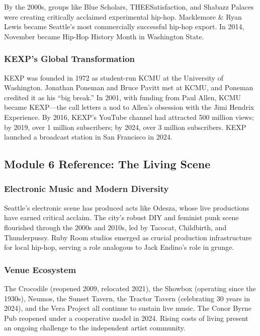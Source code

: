 \documentclass[11pt,letterpaper]{article}
\begin{document}
By the 2000s, groups like Blue Scholars, THEESatisfaction, and Shabazz Palaces were creating critically acclaimed experimental hip-hop. Macklemore \& Ryan Lewis became Seattle's most commercially successful hip-hop export. In 2014, November became Hip-Hop History Month in Washington State.

\subsubsection{KEXP's Global Transformation}

KEXP was founded in 1972 as student-run KCMU at the University of Washington. Jonathan Poneman and Bruce Pavitt met at KCMU, and Poneman credited it as his ``big break.'' In 2001, with funding from Paul Allen, KCMU became KEXP---the call letters a nod to Allen's obsession with the Jimi Hendrix Experience. By 2016, KEXP's YouTube channel had attracted 500 million views; by 2019, over 1 million subscribers; by 2024, over 3 million subscribers. KEXP launched a broadcast station in San Francisco in 2024.

\subsection{Module 6 Reference: The Living Scene}

\subsubsection{Electronic Music and Modern Diversity}

Seattle's electronic scene has produced acts like Odesza, whose live productions have earned critical acclaim. The city's robust DIY and feminist punk scene flourished through the 2000s and 2010s, led by Tacocat, Childbirth, and Thunderpussy. Ruby Room studios emerged as crucial production infrastructure for local hip-hop, serving a role analogous to Jack Endino's role in grunge.

\subsubsection{Venue Ecosystem}

The Crocodile (reopened 2009, relocated 2021), the Showbox (operating since the 1930s), Neumos, the Sunset Tavern, the Tractor Tavern (celebrating 30 years in 2024), and the Vera Project all continue to sustain live music. The Conor Byrne Pub reopened under a cooperative model in 2024. Rising costs of living present an ongoing challenge to the independent artist community.
\end{document}
